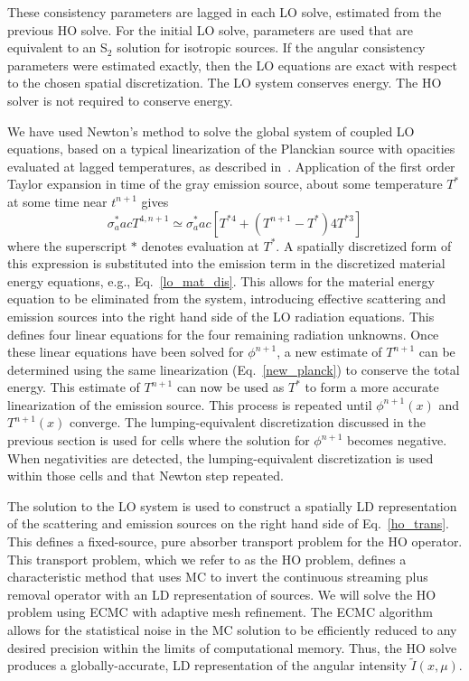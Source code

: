 \documentclass{mc2013}
\begin{document}
 These consistency parameters are lagged in each LO solve,
estimated from the previous HO solve. For the initial LO solve, parameters are used
that are equivalent to an S$_2$ solution for isotropic sources.
If the angular consistency parameters were estimated exactly, then the LO equations are exact with respect to the chosen
spatial discretization. The LO system conserves energy. The HO solver is not required
to conserve energy.


We have used Newton's method to solve the global system of coupled LO
equations, based on a typical linearization of the Planckian source with opacities
evaluated at lagged temperatures, as described in~\cite{morel_newton}.  Application of the first order Taylor expansion in time of the
gray emission source, about some temperature $T^*$ at some
time near $t^{n+1}$ gives
\begin{equation}\label{new_planck}
    \sigma_a^* a c T^{4,n+1} \simeq \sigma_a^* a c \left[T^{*4} + (T^{n+1} - T^*) 4T^{*3} \right]
\end{equation}
where the superscript $*$ denotes evaluation at $T^*$. A spatially discretized form
of this expression is substituted
into the emission term in the discretized material
energy equations, e.g., Eq.~\eqref{lo_mat_dis}.  This allows for the material energy
equation to be eliminated from the system, introducing effective scattering and
emission sources into the right hand side
of the LO radiation equations. This defines four linear equations for the four remaining radiation unknowns. 
Once these linear equations have been solved for $\phi^{n+1}$, a new estimate of
$T^{n+1}$ can be determined using the same linearization (Eq.~\eqref{new_planck}) to
conserve the total energy.  This estimate of $T^{n+1}$ can now be used as $T^*$ to form a more
accurate linearization of the emission source.  This process is repeated until
$\phi^{n+1}(x)$ and $T^{n+1}(x)$ converge.  The lumping-equivalent discretization
discussed in the previous section is used for cells where the solution for
$\phi^{n+1}$ becomes negative. When negativities are detected, the lumping-equivalent discretization is used within
those cells and that  Newton step repeated.  


The solution to the LO system is used to construct a spatially LD representation of
the scattering and emission sources on the right hand side of Eq.~\eqref{ho_trans}.  This defines a fixed-source, pure absorber
transport problem for the HO operator. This transport problem, which we refer to as
the HO problem, defines a characteristic method that uses MC to
invert the continuous streaming plus removal operator with an LD representation of
sources. We will solve the HO problem using ECMC with adaptive mesh
refinement. The ECMC algorithm allows for the statistical noise in the MC
solution to be efficiently reduced to any desired precision within the limits of
computational memory.  Thus, the HO solve produces a
globally-accurate, LD representation of the angular intensity
$\tilde{I}(x,\mu)$.  
\end{document}
